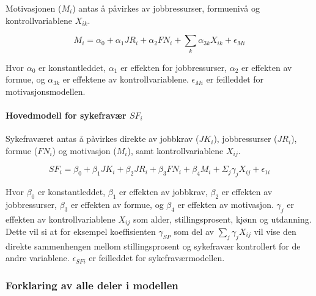 \documentclass[
  12pt,
  a4paper,
  DIV=11,
  numbers=noendperiod]{scrartcl}
\let\oldparagraph\paragraph
\renewcommand{\paragraph}[1]{\oldparagraph{#1}\mbox{}}
\begin{document}
Motivasjonen (\(M_i\)) antas å påvirkes av jobbressurser, formuenivå og
kontrollvariablene \(X_{ik}\).

\begin{equation}
  M_i = \alpha_0 + \alpha_1 JR_i + \alpha_2 FN_i + \sum_k \alpha_{3k}X_{ik} + \epsilon_{Mi} \label{eq:motivasjon}
\end{equation}

Hvor \(\alpha_0\) er konstantleddet, \(\alpha_1\) er effekten for
jobbressurser, \(\alpha_2\) er effekten av formue, og \(\alpha_{3k}\) er
effektene av kontrollvariablene. \(\epsilon_{Mi}\) er feilleddet for
motivasjonsmodellen.

\paragraph{\texorpdfstring{Hovedmodell for sykefravær
\(SF_i\)}{Hovedmodell for sykefravær SF\_i}}\label{hovedmodell-for-sykefravuxe6r-sf_i}

Sykefraværet antas å påvirkes direkte av jobbkrav (\(JK_i\)),
jobbressurser (\(JR_i\)), formue (\(FN_i\)) og motivasjon (\(M_i\)),
samt kontrollvariablene \(X_{ij}\).

\begin{equation}
SF_i = \beta_0 + \beta_1 JK_i + \beta_2 JR_i + \beta_3 FN_i
        + \beta_4 M_i + \Sigma_j \gamma_{j}X_{ij} + \epsilon_{1i} \label{eq:sf_utvidet}
\end{equation}

Hvor \(\beta_0\) er konstantleddet, \(\beta_1\) er effekten av jobbkrav,
\(\beta_2\) er effekten av jobbressurser, \(\beta_3\) er effekten av
formue, og \(\beta_4\) er effekten av motivasjon. \(\gamma_{j}\) er
effekten av kontrollvariablene \(X_{ij}\) som alder, stillingsprosent,
kjønn og utdanning. Dette vil si at for eksempel koeffisienten
\(\gamma_{SP}\) som del av \(\sum_j \gamma_{j}X_{ij}\) vil vise den
direkte sammenhengen mellom stillingsprosent og sykefravær kontrollert
for de andre variablene. \(\epsilon_{SFi}\) er feilleddet for
sykefraværmodellen.

\subsubsection{Forklaring av alle deler i
modellen}\label{forklaring-av-alle-deler-i-modellen}
\end{document}

